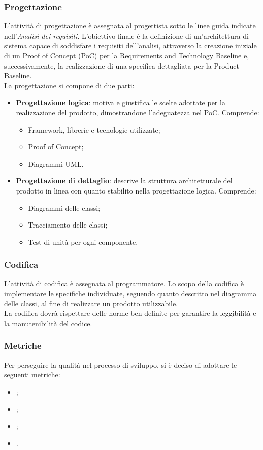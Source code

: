 \subsubsection{Progettazione}
L'attività di progettazione è assegnata al progettista sotto le linee guida
indicate nell'\textit{Analisi dei requisiti}. L'obiettivo finale è la
definizione di un'architettura di sistema capace di soddisfare i requisiti
dell'analisi, attraverso la creazione iniziale di un Proof of Concept (PoC) per
la Requirements and Technology Baseline e, successivamente, la realizzazione di una
specifica dettagliata per la Product Baseline. \\
La progettazione si compone di due parti:
\begin{itemize}
    \item \textbf{Progettazione logica}: motiva e giustifica le scelte adottate per la realizzazione del prodotto, 
    dimostrandone l'adeguatezza nel PoC. Comprende:
          \begin{itemize}
              \item Framework, librerie e tecnologie utilizzate;
              \item Proof of Concept;
              \item Diagrammi UML.
          \end{itemize}
    \item \textbf{Progettazione di dettaglio}: descrive la struttura architetturale del prodotto in linea con quanto 
    stabilito nella progettazione logica. Comprende:
          \begin{itemize}
              \item Diagrammi delle classi;
              \item Tracciamento delle classi;
              \item Test di unità per ogni componente.
          \end{itemize}
\end{itemize}

\subsubsection{Codifica}
L'attività di codifica è assegnata al programmatore. Lo scopo della codifica è
implementare le specifiche individuate, seguendo quanto descritto nel
diagramma delle classi, al fine di realizzare un prodotto utilizzabile. \\
La codifica dovrà rispettare delle norme ben definite per garantire la leggibilità
e la manutenibilità del codice.

\subsubsection{Metriche}
Per perseguire la qualità nel processo di sviluppo, si è deciso di adottare le
seguenti metriche:
\begin{itemize}
    \item {};
    \item {};
    \item {};
    \item {}.
\end{itemize}

